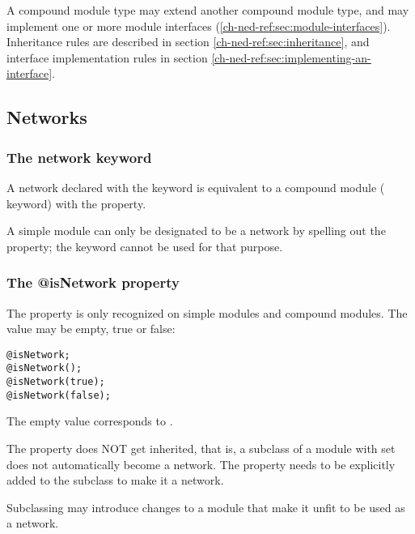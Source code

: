 A compound module type may extend another compound module type, and
may implement one or more module interfaces (\ref{ch-ned-ref:sec:module-interfaces}).
Inheritance rules are described in section \ref{ch-ned-ref:sec:inheritance},
and interface implementation rules in section \ref{ch-ned-ref:sec:implementing-an-interface}.



\subsection{Networks}
\label{ch-ned-ref:sec:networks}

\subsubsection{The network keyword}

A network declared with the  keyword is equivalent to a compound
module ( keyword) with the  property.

\begin{note}
    A simple module can only be designated to be a network by spelling out the
     property; the  keyword cannot
    be used for that purpose.
\end{note}

\subsubsection{The @isNetwork property}

The  property is only recognized on simple modules and
compound modules. The value may be empty, true or false:

\begin{verbatim}
@isNetwork;
@isNetwork();
@isNetwork(true);
@isNetwork(false);
\end{verbatim}

The empty value corresponds to .

The  property does NOT get inherited, that is, a subclass
of a module with  set does not automatically become a network.
The  property needs to be explicitly added to the subclass
to make it a network.

\begin{rationale}
    Subclassing may introduce changes to a module that make it unfit to be used
    as a network.
\end{rationale}



